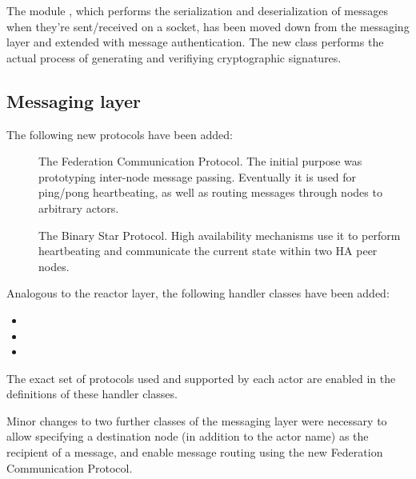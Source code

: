 The module , which performs the serialization and
deserialization of messages when they're sent/received on a socket, has been
moved down from the messaging layer and extended with message authentication.
The new class  performs the actual
process of generating and verifiying cryptographic signatures.

\subsection{Messaging layer}
The following new protocols have been added:
\begin{description}
	\item [] The Federation Communication
		Protocol. The initial purpose was prototyping inter-node
		message passing. Eventually it is used for ping/pong
		heartbeating, as well as routing messages through nodes to
		arbitrary actors.

	\item [] The Binary Star Protocol. High
		availability mechanisms use it to perform heartbeating and
		communicate the current state within two HA peer nodes.

\end{description}

Analogous to the reactor layer, the following handler classes have been added:
\begin{itemize}
	\item {}
	\item {}
	\item {}
\end{itemize}
The exact set of protocols used and supported by each actor are enabled in the
definitions of these handler classes.

Minor changes to two further classes of the messaging layer were necessary to
allow specifying a destination node (in addition to the actor name) as the
recipient of a message, and enable message routing using the new Federation
Communication Protocol.


